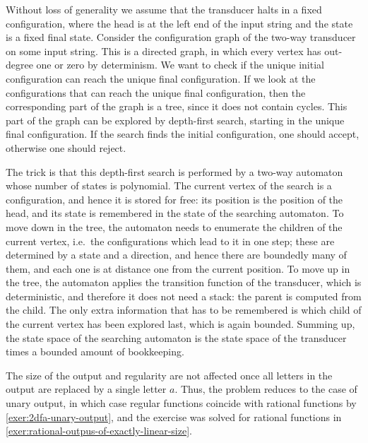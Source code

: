   {
Without loss of generality we assume that the transducer halts in a fixed configuration, where the head is at the left end of the input string and the state is a fixed final state.
    Consider the configuration graph of the two-way transducer on some input string. This is a directed graph, in which every vertex has out-degree one or zero by determinism. We want to check if the unique initial configuration can reach the unique final configuration. If we look at the configurations that can reach the unique final configuration, then the corresponding part of the graph is a tree, since it does not contain cycles. This part of the graph can be explored by depth-first search, starting in the unique final configuration. If the search finds the initial configuration, one should accept, otherwise one should reject.

    The trick is that this depth-first search is performed by a two-way automaton whose number of states is polynomial. The current vertex of the search is a configuration, and hence it is stored for free: its position is the position of the head, and its state is remembered in the state of the searching automaton. To move down in the tree, the automaton needs to enumerate the children of the current vertex, i.e.~the configurations which lead to it in one step; these are determined by a state and a direction, and hence there are boundedly many of them, and each one is at distance one from the current position. To move up in the tree, the automaton applies the transition function of the transducer, which is deterministic, and therefore it does not need a stack: the parent is computed from the child. The only extra information that has to be remembered is which child of the current vertex has been explored last, which is again bounded. Summing up, the state space of the searching automaton is the state space of the transducer times a bounded amount of bookkeeping.
}


    {The size of the output and regularity are not affected  once all letters in the output are replaced by a single letter $a$. Thus, the problem reduces to the case of unary output, in which case regular functions coincide with rational functions by \cref{exer:2dfa-unary-output}, and the exercise was solved for rational functions in \cref{exer:rational-outpus-of-exactly-linear-size}.
}

